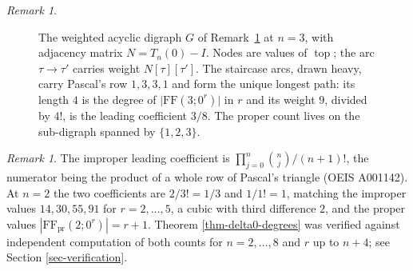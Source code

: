 \documentclass[11pt, a4paper, abstract=yes]{scrartcl}
\theoremstyle{definition}
\theoremstyle{remark}
\newtheorem{remark}[definition]{Remark}
\theoremstyle{plain}
\newcommand{\tp}{\operatorname{top}}
\begin{document}
\begin{remark}
\begin{figure}[htbp]
\centering
{}
\caption{The weighted acyclic digraph \(G\) of Remark~\ref{rem-delta0-digraph} at \(n=3\), with
adjacency matrix \(N=T_n(0)-I\). Nodes are values of \(\tp\); the arc \(\tau\to\tau'\) carries
weight \(N[\tau][\tau']\). The staircase arcs, drawn heavy, carry Pascal's row \(1,3,3,1\) and
form the unique longest path: its length \(4\) is the degree of
\(\lvert\mathrm{FF}(3;0^r)\rvert\) in \(r\) and its weight \(9\), divided by \(4!\), is the
leading coefficient \(3/8\). The proper count lives on the sub-digraph spanned by
\(\lbrace1,2,3\rbrace\).}
\label{fig:delta0-digraph}
\end{figure}
\label{rem-delta0-digraph}
\end{remark}

\begin{remark}
The improper leading coefficient is \(\prod_{j=0}^{n}\binom nj\big/(n+1)!\), the numerator being the
product of a whole row of Pascal's triangle (OEIS A001142). At \(n=2\) the two coefficients are
\(2/3!=1/3\) and \(1/1!=1\), matching the improper values \(14,30,55,91\) for \(r=2,\dots,5\), a
cubic with third difference \(2\), and the proper values
\(|\mathrm{FF}_{\mathrm{pr}}(2;0^r)|=r+1\). Theorem \ref{thm-delta0-degrees} was verified against
independent computation of both counts for \(n=2,\dots,8\) and \(r\) up to \(n+4\); see
Section \ref{sec-verification}.
\label{rem-delta0-degrees}
\end{remark}
\end{document}
